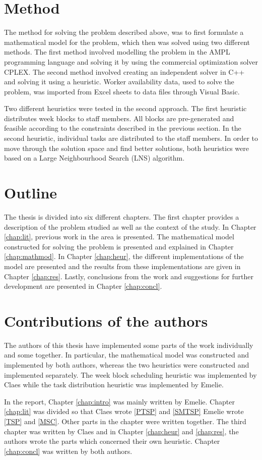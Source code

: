 \section{Method}
The method for solving the problem described above, was to first formulate a mathematical model for the problem, which then was solved using two different methods. The first method involved modelling the problem in the AMPL programming language and solving it by using the commercial optimization solver CPLEX. The second method involved creating an independent solver in C++ and solving it using a heuristic. Worker availability data, used to solve the problem, was imported from Excel sheets to data files through Visual Basic.

Two different heuristics were tested in the second approach. The first heuristic distributes week blocks to staff members. All blocks are pre-generated and feasible according to the constraints described in the previous section. In the second heuristic, individual tasks are distributed to the staff members. In order to move through the solution space and find better solutions, both heuristics were based on a Large Neighbourhood Search (LNS) algorithm.

\section{Outline}

The thesis is divided into six different chapters. The first chapter provides a description of the problem studied as well as the context of the study. In Chapter \ref{chap:lit}, previous work in the area is presented. The mathematical model constructed for solving the problem is presented and explained in Chapter \ref{chap:mathmod}. In Chapter \ref{chap:heur}, the different implementations of the model are presented and the results from these implementations are given in Chapter \ref{chap:res}. Lastly, conclusions from the work and suggestions for further development are presented in Chapter \ref{chap:concl}.

\section{Contributions of the authors}

The authors of this thesis have implemented some parts of the work individually and some together. In particular, the mathematical model was constructed and implemented by both authors, whereas the two heuristics were constructed and implemented separately. The week block scheduling heuristic was implemented by Claes while the task distribution heuristic was implemented by Emelie.

In the report, Chapter \ref{chap:intro} was mainly written by Emelie. Chapter \ref{chap:lit} was divided so that Claes wrote \ref{PTSP} and \ref{SMTSP} Emelie wrote \ref{TSP} and \ref{MSC}. Other parts in the chapter were written together. The third chapter was written by Claes and in Chapter \ref{chap:heur} and \ref{chap:res}, the authors wrote the parts which concerned their own heuristic. Chapter \ref{chap:concl} was written by both authors.
 

